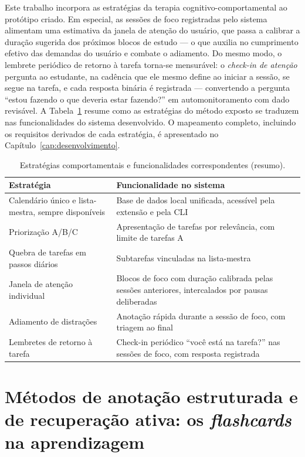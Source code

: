 \documentclass[12pt, %
openright, 
oneside,
a4paper,
english,   %
brazil]{facom-ufu-abntex2}
\begin{document}
Este trabalho incorpora as estratégias da terapia cognitivo-comportamental ao
protótipo criado. Em especial, as sessões de foco registradas pelo sistema
alimentam uma estimativa da janela de atenção do usuário, que passa a calibrar
a duração sugerida dos próximos blocos de estudo --- o que auxilia no
cumprimento efetivo das demandas do usuário e combate o adiamento. Do mesmo
modo, o lembrete periódico de retorno à tarefa torna-se mensurável: o
\textit{check-in de atenção} pergunta ao estudante, na cadência que ele mesmo
define ao iniciar a sessão, se segue na tarefa, e cada resposta binária é
registrada --- convertendo a pergunta ``estou fazendo o que deveria estar
fazendo?'' em automonitoramento com dado revisável. A
Tabela~\ref{tab:estrategias-funcionalidades} resume como as estratégias do
método exposto se traduzem nas funcionalidades do sistema desenvolvido. O
mapeamento completo, incluindo os requisitos derivados de cada estratégia, é
apresentado no Capítulo~\ref{cap:desenvolvimento}.

\begin{table}[htbp]
\centering
\caption{Estratégias comportamentais e funcionalidades correspondentes (resumo).}
\label{tab:estrategias-funcionalidades}
\begin{tabular}{p{6.5cm}p{7.5cm}}
\hline
\textbf{Estratégia} & \textbf{Funcionalidade no sistema} \\
\hline
Calendário único e lista-mestra, sempre disponíveis & Base de dados local unificada, acessível pela extensão e pela CLI \\
Priorização A/B/C & Apresentação de tarefas por relevância, com limite de tarefas A \\
Quebra de tarefas em passos diários & Subtarefas vinculadas na lista-mestra \\
Janela de atenção individual & Blocos de foco com duração calibrada pelas sessões anteriores, intercalados por pausas deliberadas \\
Adiamento de distrações & Anotação rápida durante a sessão de foco, com triagem ao final \\
Lembretes de retorno à tarefa & Check-in periódico ``você está na tarefa?'' nas sessões de foco, com resposta registrada \\
\hline
\end{tabular}
\end{table}

\section{Métodos de anotação estruturada e de recuperação ativa: os \textit{flashcards} na aprendizagem}
\label{sec:anotacao-recuperacao}
\end{document}
